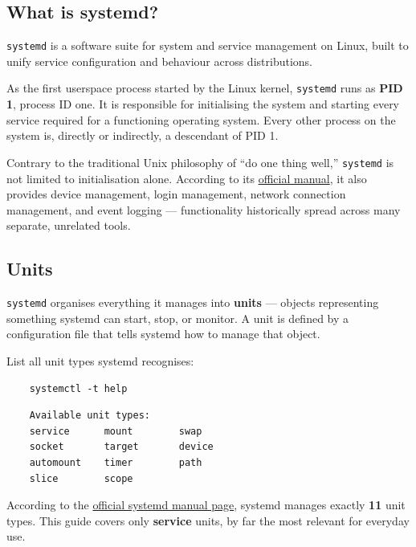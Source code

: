 \documentclass{article}
\newcommand{\code}[1]{\colorbox{codebg}{\texttt{#1}}}
\begin{document}
\subsection{What is systemd?}

\code{systemd} is a software suite for system and service management on Linux,
built to unify service configuration and behaviour across distributions.

\begin{tcolorbox}[arc=12pt, outer arc=10pt,
	colback=blue!4!white, colframe=blue!40!black,
	title=\textbf{PID 1}]
	As the first userspace process started by the Linux kernel, \code{systemd}
	runs as \textbf{PID 1}, process ID one. It is responsible for initialising
	the system and starting every service required for a functioning operating
	system. Every other process on the system is, directly or indirectly, a
	descendant of PID 1.
\end{tcolorbox}

\noindent Contrary to the traditional Unix philosophy of ``do one thing well,''
\code{systemd} is not limited to initialisation alone. According to its
\href{https://www.freedesktop.org/software/systemd/man/latest/systemd.html}{official
	manual}, it also provides device management, login management, network
connection management, and event logging --- functionality historically spread
across many separate, unrelated tools.

\subsection{Units}

\code{systemd} organises everything it manages into \textbf{units} --- objects
representing something systemd can start, stop, or monitor. A unit is defined by
a configuration file that tells systemd how to manage that object.

List all unit types systemd recognises:

\begin{verbatim}
	systemctl -t help
\end{verbatim}

\begin{verbatim}
	Available unit types:
	service      mount        swap
	socket       target       device
	automount    timer        path
	slice        scope
\end{verbatim}

\noindent According to the
\href{https://man.archlinux.org/man/systemd.1.en}{official systemd manual page},
systemd manages exactly \textbf{11} unit types. This guide covers only
\textbf{service} units, by far the most relevant for everyday use.
\end{document}
